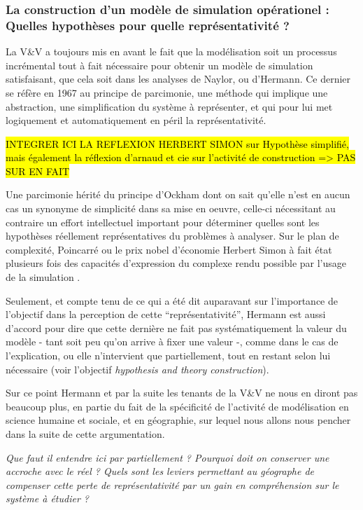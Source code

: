 \subsubsection{La construction d'un modèle de simulation opérationel : Quelles hypothèses pour quelle représentativité ?}
\label{sssec:hypothese_representativite}

La V\&V a toujours mis en avant le fait que la modélisation soit un processus incrémental tout à fait nécessaire pour obtenir un modèle de simulation satisfaisant, que cela soit dans les analyses de Naylor, ou d'Hermann. Ce dernier se réfère en 1967 au principe de parcimonie, une méthode qui implique une abstraction, une simplification du système à représenter, et qui pour lui met logiquement et automatiquement en péril la représentativité.  

\hl{INTEGRER ICI LA REFLEXION HERBERT SIMON sur Hypothèse simplifié, mais également la réflexion d'arnaud et cie sur l'activité de construction => PAS SUR EN FAIT}

Une parcimonie hérité du principe d'Ockham dont on sait qu'elle n'est en aucun cas un synonyme de simplicité dans sa mise en oeuvre, celle-ci nécessitant au contraire un effort intellectuel important pour déterminer quelles sont les hypothèses réellement représentatives du problèmes à analyser. Sur le plan de complexité, Poincarré ou le prix nobel d'économie Herbert Simon à fait état plusieurs fois des capacités d'expression du complexe rendu possible par l'usage de la simulation .\autocite{Banos2013a}

Seulement, et compte tenu de ce qui a été dit auparavant sur l'importance de l'objectif dans la perception de cette \enquote{représentativité}, Hermann est aussi d'accord pour dire que cette dernière ne fait pas systématiquement la valeur du modèle - tant soit peu qu'on arrive à fixer une valeur -, comme dans le cas de l'explication, ou elle n'intervient que partiellement, tout en restant selon lui nécessaire (voir l'objectif \textit{hypothesis and theory construction}).

Sur ce point Hermann et par la suite les tenants de la V\&V ne nous en diront pas beaucoup plus, en partie du fait de la spécificité de l'activité de modélisation en science humaine et sociale, et en géographie, sur lequel nous allons nous pencher dans la suite de cette argumentation.

\textit{Que faut il entendre ici par partiellement ? Pourquoi doit on conserver une accroche avec le réel ? Quels sont les leviers permettant au géographe de compenser cette perte de représentativité par un gain en compréhension sur le système à étudier ? }

